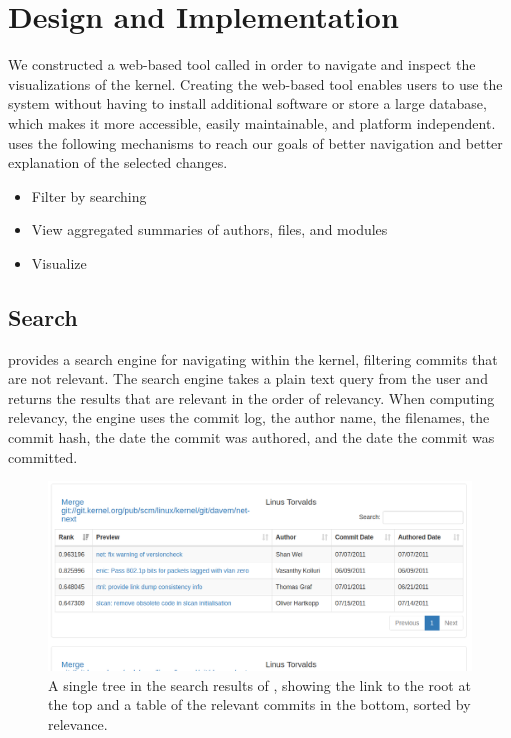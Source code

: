 
\section{Design and Implementation}
\label{sec:design}

We constructed a web-based tool called \tool in order to navigate and
inspect the \mt visualizations of the kernel. Creating the web-based
tool enables users to use the system without having to install
additional software or store a large database, which makes it more
accessible, easily maintainable, and platform independent. \tool uses
the following mechanisms to reach our goals of better navigation and
better explanation of the selected changes.

\begin{itemize}
        \item Filter by searching
        \item View aggregated summaries of authors, files, and modules
        \item Visualize 
\end{itemize}

\subsection{Search}

\tool provides a search engine for navigating within the kernel,
filtering commits that are not relevant. The search engine takes a
plain text query from the user and returns the results that are relevant
in the order of relevancy. When computing relevancy, the engine uses the
commit log, the author name, the filenames, the commit hash, the date
the commit was authored, and the date the commit was committed.

\begin{figure}[htpb]
  \centering
  \includegraphics[width=\figwidth]{figures/linvis/search_results.png}
  \caption{A single \mt tree in the search results of \tool, showing
    the link to the root at the top and a table of the relevant commits
    in the bottom, sorted by relevance.}
  \label{fig:search_results}
\end{figure}


